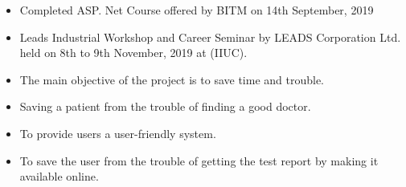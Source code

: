 \documentclass[10pt,a4paper]{altacv}
\begin{document}
\begin{itemize}
\item Completed ASP. Net Course offered by BITM on 14th September, 2019
\item Leads Industrial Workshop and Career Seminar by LEADS Corporation Ltd. \\held on 8th to 9th November, 2019 at (IIUC).

\end{itemize}

\begin{itemize}
\item The main objective of the project is to save time and trouble.
\item Saving a patient from the trouble of finding a good doctor.
\item To provide users a user-friendly system.
\item To save the user from the trouble of getting the test report by making it available online.
\end{itemize}




{}

{}

\clearpage
\end{document}

